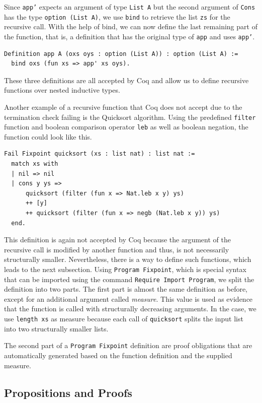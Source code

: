 \documentclass[a4paper, 11pt, fleqn, twoside]{scrreprt}
\newcommand{\cinl}[1]{\texttt{#1}}
\begin{document}
Since \cinl{app'} expects an argument of type \cinl{List A} but the second argument of \cinl{Cons} has the type \cinl{option (List A)}, we use \cinl{bind} to retrieve the list \cinl{zs} for the recursive call.
With the help of bind, we can now define the last remaining part of the function, that is, a definition that has the original type of \cinl{app} and uses \cinl{app'}.

\begin{verbatim}
Definition app A (oxs oys : option (List A)) : option (List A) :=
  bind oxs (fun xs => app' xs oys).
\end{verbatim}

These three definitions are all accepted by Coq and allow us to define recursive functions over nested inductive types.

Another example of a recursive function that Coq does not accept due to the termination check failing is the Quicksort algorithm.
Using the predefined \cinl{filter} function and boolean comparison operator \cinl{leb} as well as boolean negation, the function could look like this.

\begin{verbatim}
Fail Fixpoint quicksort (xs : list nat) : list nat :=
  match xs with
  | nil => nil
  | cons y ys => 
      quicksort (filter (fun x => Nat.leb x y) ys)
      ++ [y]
      ++ quicksort (filter (fun x => negb (Nat.leb x y)) ys)
  end.
\end{verbatim}

This definition is again not accepted by Coq because the argument of the recursive call is modified by another function and thus, is not necessarily structurally smaller.
Nevertheless, there is a way to define such functions, which leads to the next subsection.
Using \cinl{Program Fixpoint}, which is special syntax that can be imported using the command \cinl{Require Import Program}, we split the definition into two parts.
The first part is almost the same definition as before, except for an additional argument called \textit{measure}.
This value is used as evidence that the function is called with structurally decreasing arguments.
In the case, we use \cinl{length xs} as measure because each call of \cinl{quicksort} splits the input list into two structurally smaller lists.

The second part of a \cinl{Program Fixpoint} definition are proof obligations that are automatically generated based on the function definition and the supplied measure.

\subsection{Propositions and Proofs}
\end{document}
